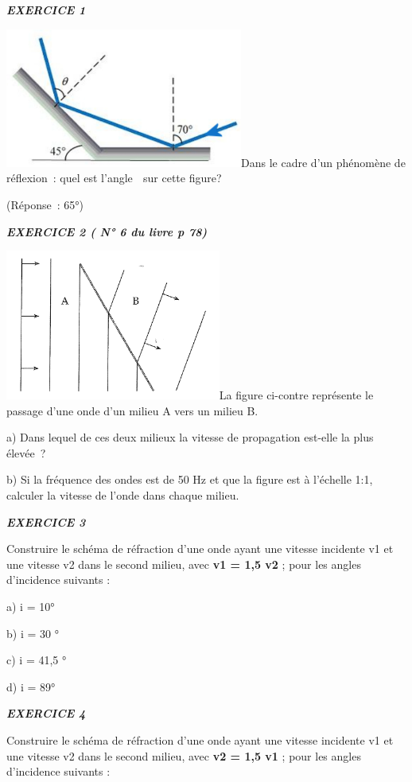 \emph{\textbf{EXERCICE 1}}

\includegraphics[width=7.807cm,height=4.581cm]{Pictures/10000001000004570000028CCC770E758E0BAEF3.png}Dans
le cadre d'un phénomène de réflexion~: quel est l'angle  sur cette
figure?

(Réponse~: 65°)

\emph{\textbf{EXERCICE 2 ( N° 6 du livre p 78)}}

\includegraphics[width=7.086cm,height=4.948cm]{Pictures/10000001000003620000025DC72F2F5C1B5B30DC.png}La
figure ci-contre représente le passage d'une onde d'un milieu A vers un
milieu B.

a) Dans lequel de ces deux milieux la vitesse de propagation est-elle la
plus élevée~?

b) Si la fréquence des ondes est de 50 Hz et que la figure est à
l'échelle 1:1, calculer la vitesse de l'onde dans chaque milieu.

\emph{\textbf{EXERCICE 3}}

Construire le schéma de réfraction d'une onde ayant une vitesse
incidente v1 et une vitesse v2 dans le second milieu, avec \textbf{v1 =
1,5 v2} ; pour les angles d'incidence suivants :

a) i = 10°

b) i = 30 °

c) i = 41,5 °

d) i = 89°

\emph{\textbf{EXERCICE 4}}

Construire le schéma de réfraction d'une onde ayant une vitesse
incidente v1 et une vitesse v2 dans le second milieu, avec \textbf{v2 =
1,5 v1} ; pour les angles d'incidence suivants :

